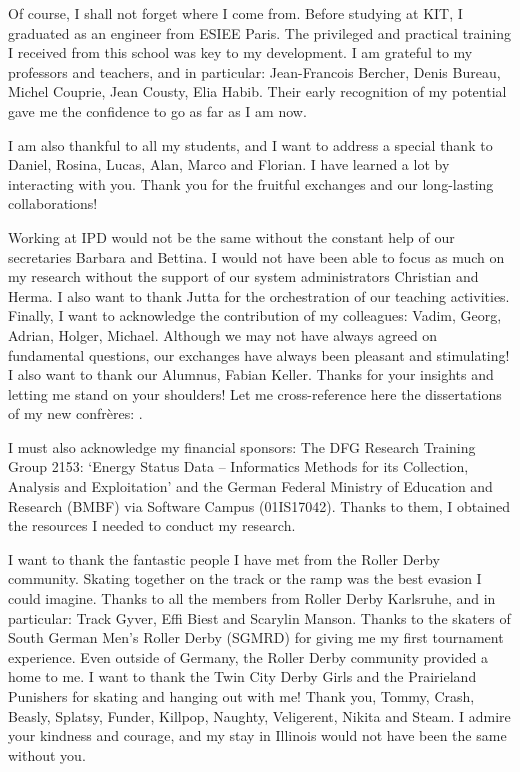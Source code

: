 \documentclass[smalldiss]{sdqdiss-a4}
\begin{document}
Of course, I shall not forget where I come from. Before studying at KIT, I graduated as an engineer from ESIEE Paris. The privileged and practical training I received from this school was key to my development. I am grateful to my professors and teachers, and in particular: Jean-Francois Bercher, Denis Bureau, Michel Couprie, Jean Cousty, Elia Habib. Their early recognition of my potential gave me the confidence to go as far as I am now. 

I am also thankful to all my students, and I want to address a special thank to Daniel, Rosina, Lucas, Alan, Marco and Florian. I have learned a lot by interacting with you. Thank you for the fruitful exchanges and our long-lasting collaborations!  

Working at IPD would not be the same without the constant help of our secretaries Barbara and Bettina. I would not have been able to focus as much on my research without the support of our system administrators Christian and Herma. I also want to thank Jutta for the orchestration of our teaching activities. Finally, I want to acknowledge the contribution of my colleagues: Vadim, Georg, Adrian, Holger, Michael. Although we may not have always agreed on fundamental questions, our exchanges have always been pleasant and stimulating! I also want to thank our Alumnus, Fabian Keller. Thanks for your insights and letting me stand on your shoulders! Let me cross-reference here the dissertations of my new confrères: \cite{DBLP:phd/dnb/Steinbuss20, DBLP:phd/dnb/Vollmer20, DBLP:phd/dnb/Trittenbach20, DBLP:phd/dnb/Keller15}.

I must also acknowledge my financial sponsors: The DFG Research Training Group 2153: `Energy Status Data – Informatics Methods for its Collection, Analysis and Exploitation' and the German Federal Ministry of Education and Research (BMBF) via Software Campus (01IS17042). Thanks to them, I obtained the resources I needed to conduct my research.

I want to thank the fantastic people I have met from the Roller Derby community. Skating together on the track or the ramp was the best evasion I could imagine. Thanks to all the members from Roller Derby Karlsruhe, and in particular: Track Gyver, Effi Biest and Scarylin Manson. Thanks to the skaters of South German Men's Roller Derby (SGMRD) for giving me my first tournament experience. Even outside of Germany, the Roller Derby community provided a home to me. I want to thank the Twin City Derby Girls and the Prairieland Punishers for skating and hanging out with me! Thank you, Tommy, Crash, Beasly, Splatsy, Funder, Killpop, Naughty, Veligerent, Nikita and Steam. I admire your kindness and courage, and my stay in Illinois would not have been the same without you. 
\end{document}
